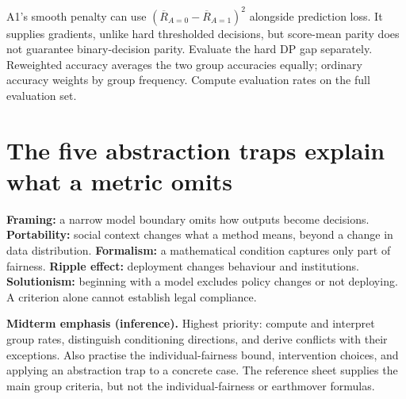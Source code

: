 \documentclass[11pt,letterpaper]{article}
\begin{document}
A1's smooth penalty can use
$(\overline{R}_{A=0}-\overline{R}_{A=1})^2$ alongside prediction loss.
It supplies gradients, unlike hard thresholded decisions, but score-mean parity
does not guarantee binary-decision parity. Evaluate the hard DP gap separately.
Reweighted accuracy averages the two group accuracies equally; ordinary accuracy
weights by group frequency. Compute evaluation rates on the full evaluation set.

\section*{The five abstraction traps explain what a metric omits}
\textbf{Framing:} a narrow model boundary omits how outputs become decisions.
\textbf{Portability:} social context changes what a method means, beyond a change
in data distribution. \textbf{Formalism:} a mathematical condition captures only
part of fairness. \textbf{Ripple effect:} deployment changes behaviour and
institutions. \textbf{Solutionism:} beginning with a model excludes policy changes
or not deploying. A criterion alone cannot establish legal compliance.

\textbf{Midterm emphasis (inference).} Highest priority: compute and interpret
group rates, distinguish conditioning directions, and derive conflicts with their
exceptions. Also practise the individual-fairness bound, intervention choices, and
applying an abstraction trap to a concrete case. The reference sheet supplies the
main group criteria, but not the individual-fairness or earthmover formulas.

\end{document}
